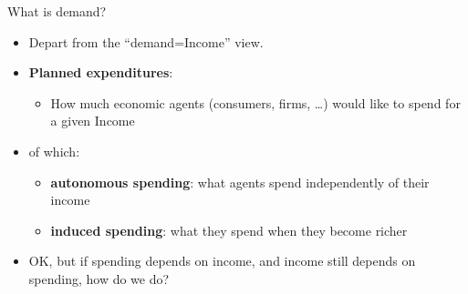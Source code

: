 \begin{frame}{What is demand?}
\protect\hypertarget{what-is-demand}{}
\begin{itemize}
\item
  Depart from the ``demand=Income'' view.
\item
  \textbf{Planned expenditures}:

  \begin{itemize}
  \tightlist
  \item
    How much economic agents (consumers, firms, \ldots) would like to
    spend for a given Income
  \end{itemize}
\item
  of which:

  \begin{itemize}
  \tightlist
  \item
    \textbf{autonomous spending}: what agents spend independently of
    their income
  \item
    \textbf{induced spending}: what they spend when they become richer
  \end{itemize}
\item
  OK, but if spending depends on income, and income still depends on
  spending, how do we do?
\end{itemize}
\end{frame}

